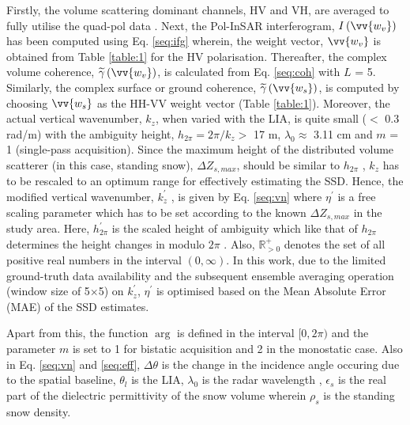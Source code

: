 \documentclass[12pt]{elsarticle}
\numberwithin{equation}{section}
\numberwithin{figure}{section}
\numberwithin{table}{section}
\begin{document}
Firstly, the volume scattering dominant channels, HV and VH, are averaged to fully utilise the quad-pol data \citep{Cloude2005}. Next, the Pol-InSAR interferogram, $I\left(\vv{w_v}\right)$ has been computed using Eq. \eqref{seq:ifg} wherein, the weight vector, $\vv{w_v}$ is obtained from Table \ref{table:1} for the HV polarisation. Thereafter, the complex volume coherence, $\widetilde{\gamma}\left(\vv{w_v}\right)$, is calculated from Eq. \eqref{seq:coh} with $L$ = 5. Similarly, the complex surface or ground coherence, $\widetilde{\gamma}\left(\vv{w_s}\right)$, is computed by choosing $\vv{w_s}$ as the HH-VV weight vector (Table \ref{table:1}). Moreover, the actual vertical wavenumber, $k_z$, when varied with the LIA, is quite small ($<$ 0.3 rad/m) with the ambiguity height, $h_{2\pi} = 2\pi/k_z >$ 17 m, $\lambda_0 \approx$ 3.11 cm and $m$ = 1 (single-pass acquisition). Since the maximum height of the distributed volume scatterer (in this case, standing snow), $\Delta{Z_{s,max}}$, should be similar to $h_{2\pi}$ \citep{Kugler2015, Hajnsek2009, Kumar2017}, $k_z$ has to be rescaled to an optimum range for effectively estimating the SSD. Hence, the modified vertical wavenumber, $k_z^\prime$ , is given by Eq. \eqref{seq:vn} where $\eta^\prime$ is a free scaling parameter which has to be set according to the known $\Delta{Z_{s,max}}$ in the study area. Here, $h_{2\pi}^\prime$ is the scaled height of ambiguity which like that of $h_{2\pi}$ determines the height changes in modulo $2\pi$ \citep{Hanssen2001}. Also, $\mathbb{R}_{>0}^+$ denotes the set of all positive real numbers in the interval $(0, \infty)$. In this work, due to the limited ground-truth data availability and the subsequent ensemble averaging operation (window size of 5$\times$5) on $k_z^\prime$, $\eta^\prime$ is optimised based on the Mean Absolute Error (MAE) of the SSD estimates. 

Apart from this, the function $\arg$ is defined in the interval $[0, 2\pi)$ and the parameter $m$ is set to 1 for bistatic acquisition and 2 in the monostatic case. Also in Eq. \eqref{seq:vn} and \eqref{seq:eff}, $\Delta\theta$ is the change in the incidence angle occuring due to the spatial baseline, $\theta_l$ is the LIA, $\lambda_0$ is the radar wavelength \citep{Cloude2010, Kugler2015}, $\epsilon_s$ is the real part of the dielectric permittivity of the snow volume wherein $\rho_s$ is the standing snow density\citep{Sharma2007, Leinss2015}.
\end{document}
